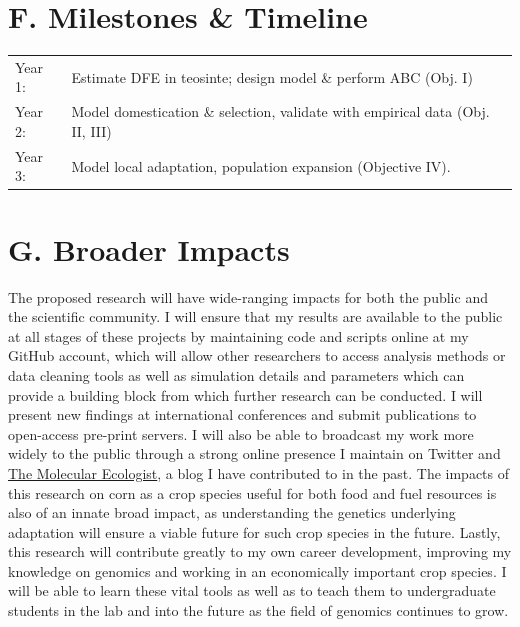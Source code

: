 \section*{F. Milestones \& Timeline}
\begin{tabular}{ll}
Year 1: & Estimate DFE in teosinte; design model \& perform ABC (Obj. I) \\
Year 2: & Model domestication \& selection, validate with empirical data (Obj. II, III)\\
Year 3: & Model local adaptation, population expansion (Objective IV).  \\
\end{tabular}

\section*{G. Broader Impacts}

The proposed research will have wide-ranging impacts for both the public and the scientific community. I will ensure that my results are available to the public at all stages of these projects by maintaining code and scripts online at my GitHub account, which will allow other researchers to access analysis methods or data cleaning tools as well as simulation details and parameters which can provide a building block from which further research can be conducted. I will present new findings at international conferences and submit publications to open-access pre-print servers. I will also be able to broadcast my work more widely to the public through a strong online presence I maintain on Twitter and \href{http://www.molecularecologist.com/}{The Molecular Ecologist}, a blog I have contributed to in the past. The impacts of this research on corn as a crop species useful for both food and fuel resources is also of an innate broad impact, as understanding the genetics underlying adaptation will ensure a viable future for such crop species in the future. Lastly, this research will contribute greatly to my own career development, improving my knowledge on genomics and working in an economically important crop species. I will be able to learn these vital tools as well as to teach them to undergraduate students in the lab and into the future as the field of genomics continues to grow.


